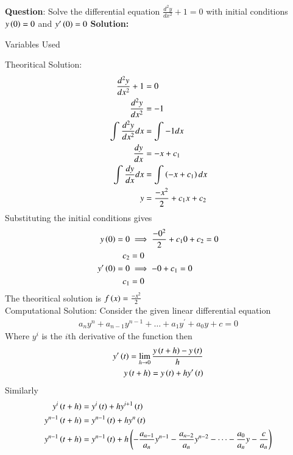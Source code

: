 \documentclass[journal]{IEEEtran}
\begin{document}
\textbf{Question}:\newline
Solve the differential equation $\frac{d^2y}{dx^2} + 1 = 0$ with initial conditions $y\left(0\right) = 0$ and $y^{\prime}\left(0\right) = 0$
\newline
\textbf{Solution: }
\begin{table}[h!]    
  \centering
  
  \caption{Variables Used}
  \label{tab1.1.2.2}
\end{table}
\newline
Theoritical Solution:
\begin{align}
	\frac{d^2y}{dx^2} + 1 &= 0\\
	\frac{d^2y}{dx^2} &= -1\\
	\int_{}^{}\frac{d^2y}{dx^2}dx &= \int_{}^{}-1dx\\
	\frac{dy}{dx} &= -x+c_1\\
	\int_{}^{}\frac{dy}{dx}dx &= \int_{}^{}\left(-x+c_1\right)dx\\
	y &= \frac{-x^2}{2}+{c_1}x+c_2\\
\end{align}
Substituting the initial conditions gives
\begin{align}
	y\left(0\right) = 0 &\implies \frac{-0^2}{2}+{c_1}0+c_2 = 0\\
	c_2 &= 0\\
	y^{\prime}\left(0\right) = 0 &\implies -0+c_1 = 0\\
	c_1 &= 0
\end{align}
The theoritical solution is $f\left(x\right) = \frac{-x^2}{2}$\\
\newline
Computational Solution:\newline
Consider the given linear differential equation
\begin{align}
	a_{n}y^n + a_{n-1}y^{n-1} + \dots + a_{1}y^\prime + a_{0}y + c = 0
\end{align}
Where $y^{i}$ is the $i$th derivative of the function then
\begin{align}
	y^{\prime}\left(t\right) = \lim_{h\to 0}\frac{y\left(t+h\right) - y\left(t\right)}{h}\\
	y\left(t+h\right) = y\left(t\right) + hy^{\prime}\left(t\right)\\
\end{align}
Similarly
\begin{align}
	y^{i}\left(t+h\right) &= y^{i}\left(t\right) + hy^{i+1}\left(t\right)\\
	y^{n-1}\left(t+h\right) &= y^{n-1}\left(t\right) + hy^{n}\left(t\right)\\
	y^{n-1}\left(t+h\right) &= y^{n-1}\left(t\right) + h\left(-\frac{a_{n-1}}{a_n}y^{n-1}-\frac{a_{n-2}}{a_n}y^{n-2} - \dots -\frac{a_{0}}{a_n}y - \frac{c}{a_n}\right)\\
\end{align}
\end{document}
